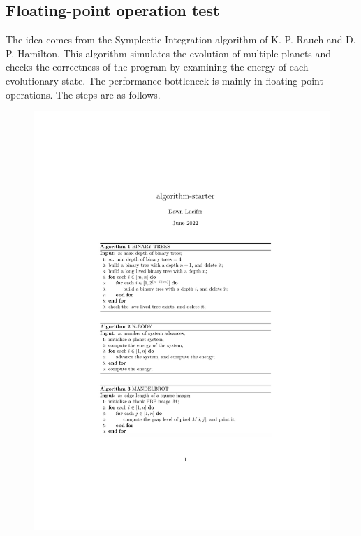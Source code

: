 \subsection{Floating-point operation test}

The idea comes from the Symplectic Integration algorithm of K. P. Rauch
and D. P. Hamilton.
This algorithm simulates the evolution of multiple planets and checks the correctness of the program by examining the energy of each evolutionary state. The performance bottleneck is mainly in floating-point operations. The steps are as follows.

\begin{figure}[htbp]
    \centerline{\includegraphics[scale=0.8]{figures/n-body}}
    \label{fig:n-body}
\end{figure}

